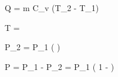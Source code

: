 Q = m C_v (T_2 - T_1)

\Delta T = 

P_2 = P_1 \left(  \right)

\Delta P = P_1 - P_2 = P_1 \left( 1 -  \right)


